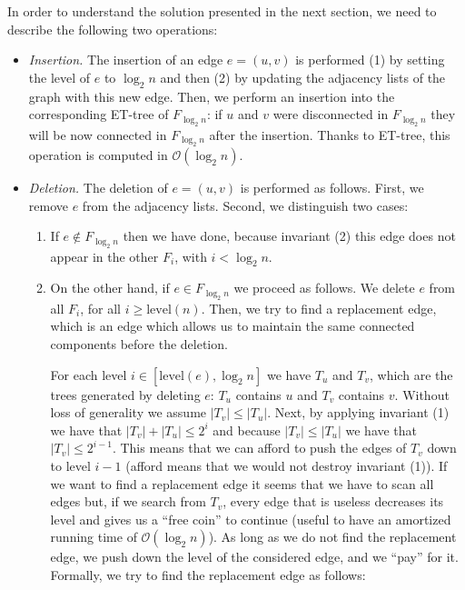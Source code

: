 \documentclass[12pt,a4paper]{article}
\begin{document}
In order to understand the solution presented in the next section, we need to describe the following two operations:

\begin{itemize}
\item \textit{Insertion.} The insertion of an edge $e = (u, v)$ is performed (1) by setting the level of $e$ to $\log_2 n$ and then (2) by updating the adjacency lists of the graph with this new edge. Then, we perform an insertion into the corresponding ET-tree of $F_{\log_2 n}$: if $u$ and $v$ were disconnected in $F_{\log_2 n}$ they will be now connected in $F_{\log_2 n}$ after the insertion. Thanks to ET-tree, this operation is computed in $\mathcal{O}(\log_2 n)$.



\item \textit{Deletion.} The deletion of $e = (u, v)$ is performed as follows. First, we remove $e$ from the adjacency lists. Second, we distinguish two cases:

\begin{enumerate}
\item If $e \not\in F_{\log_2 n}$ then we have done, because invariant (2) this edge does not appear in the other $F_i$, with $i < \log_2 n$.
\item  On the other hand, if $e \in F_{\log_2 n}$ we proceed as follows. We delete $e$ from all $F_i$, for all $i \geq \text{level}(n)$. Then, we try to find a replacement edge, which is an edge which allows us to maintain the same connected components before the deletion.



For each level $i \in [\text{level}(e), \log_2 n]$ we have $T_u$ and $T_v$, which are the trees generated by deleting $e$: $T_u$ contains $u$ and $T_v$ contains $v$. Without loss of generality we assume $|T_v| \leq |T_u|$. Next, by applying invariant (1) we have that $|T_v| + |T_u| \leq 2^i$ and because $|T_v| \leq |T_u|$ we have that $|T_v| \leq 2^{i - 1}$. This means that we can afford to push the edges of $T_v$ down to level $i - 1$ (afford means that we would not destroy invariant (1)). If we want to find a replacement edge it seems that we have to scan all edges but, if we search from $T_v$, every edge that is useless decreases its level and gives us a ``free coin'' to continue (useful to have an amortized running time of $\mathcal{O}(\log_2 n)$). As long as we do not find the replacement edge, we push down the level of the considered edge, and we ``pay'' for it. Formally, we try to find the replacement edge as follows:


\end{enumerate}
\end{itemize}
\end{document}
